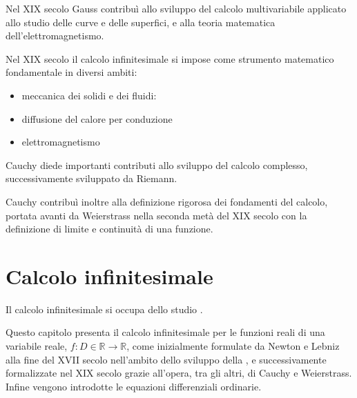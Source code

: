 \documentclass[letterpaper,10pt,english]{jupyterBook}
\begin{document}
\sphinxAtStartPar
Nel XIX secolo Gauss contribuì allo sviluppo del calcolo multivariabile applicato allo studio delle curve e delle superfici, e alla teoria matematica dell’elettromagnetismo.

\sphinxAtStartPar
Nel XIX secolo il calcolo infinitesimale si impose come strumento matematico fondamentale in diversi ambiti:
\begin{itemize}
\item {} 
\sphinxAtStartPar
meccanica dei solidi e dei fluidi:

\item {} 
\sphinxAtStartPar
diffusione del calore per conduzione

\item {} 
\sphinxAtStartPar
elettromagnetismo

\end{itemize}

\sphinxAtStartPar
Cauchy diede importanti contributi allo sviluppo del calcolo complesso, successivamente sviluppato da Riemann.

\sphinxAtStartPar
Cauchy contribuì inoltre alla definizione rigorosa dei fondamenti del calcolo, portata avanti da Weierstrass nella seconda metà del XIX secolo con la definizione di limite e continuità di una funzione.



\sphinxstepscope


\chapter{Calcolo infinitesimale}
\label{\detokenize{ch/infinitesimal_calculus:calcolo-infinitesimale}}\label{\detokenize{ch/infinitesimal_calculus:infinitesimal-calculus}}\label{\detokenize{ch/infinitesimal_calculus::doc}}
\sphinxAtStartPar
Il calcolo infinitesimale si occupa dello studio  .

\sphinxAtStartPar
Questo capitolo presenta il calcolo infinitesimale per le funzioni reali di una variabile reale, \(f: D \in \mathbb{R} \rightarrow \mathbb{R}\), come inizialmente formulate da Newton e Lebniz alla fine del XVII secolo nell’ambito dello sviluppo della , e successivamente formalizzate nel XIX secolo grazie all’opera, tra gli altri, di Cauchy e Weierstrass. Infine vengono introdotte le equazioni differenziali ordinarie.  
\end{document}
